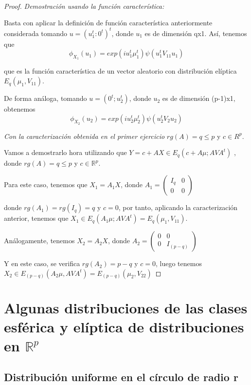 \documentclass{article}
\theoremstyle{theorem-style}  %
\theoremstyle{definition}
\theoremstyle{example-style}
\begin{document}
		\begin{proof}
			
			\textit{Demostración usando la función característica: } 
			
			Basta con aplicar la definición de función característica anteriormente considerada tomando $u = (u_1^t: 0^t)^t$, donde $u_1$ es de dimensión qx1. Así, tenemos que
			\[
				\phi_{X_1}(u_1) = exp(i u_1^t \mu_1^t) \psi(u_1^t V_{11} u_1)
			\]
			
			que es la función característica de un vector aleatorio con distribución elíptica $E_q(\mu_1, V_{11})$.
			
			De forma análoga, tomando $u = (0^t; u_2^t)$, donde $u_2$ es de dimensión (p-1)x1, obtenemos
			\[
							\phi_{X_2}(u_2) = exp(i u_2^t \mu_2^t) \psi(u_2^t V_{2} u_2)
			\]
			
			
			\textit{Con la caracterización obtenida en el primer ejercicio}
			$rg(A) = q \leq p$ y $c \in R^p$.
			

		Vamos a demostrarlo hora utilizando que $Y = c + AX \in E_q(c + A \mu; A V A^t)$ , donde  $rg(A) = q \leq p$ y $c \in \mathbb{R}^p$.
		
		Para este caso, tenemos que $X_1 = A_1 X$, donde $A_1 = \left( \begin{array}{cc}
		I_q & 0 \\ 0 & 0
		\end{array}\right)$

	
	  donde $rg(A_1) = rg(I_q) = q$ y $c = 0$, por tanto, aplicando la caracterización anterior, tenemos que $X_1 \in E_q(A_1 \mu; A V A^t) = E_q(\mu_1, V_{11})$.
	  
	  
	  Análogamente, tenemos $X_2 = A_2 X$, donde $A_2 = \left( \begin{array}{cc}
	  0 & 0 \\ 0 & I_{(p-q)}
	  \end{array}\right)$
	  
	  Y en este caso, se verifica $rg(A_2) = p-q$ y $c = 0$, luego tenemos $X_2 \in E_{(p-q)}(A_2 \mu, A V A^t) = E_{(p-q)}(\mu_2, V_{22})$
	
	\end{proof}
	\section{Algunas distribuciones de las clases esférica y elíptica de distribuciones en $\mathbb{R}^p$ }
	
	\subsection{Distribución uniforme en el círculo de radio r}
	
\end{document}
